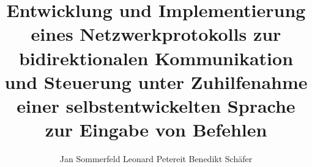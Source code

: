 \documentclass[12pt,a4paper]{scrartcl}
\begin{document}
\title{Entwicklung und Implementierung eines Netzwerkprotokolls zur bidirektionalen Kommunikation und Steuerung unter Zuhilfenahme einer selbstentwickelten Sprache zur Eingabe von Befehlen}
\author{Jan Sommerfeld Leonard Petereit Benedikt Schäfer}
\maketitle
\tableofcontents
\newpage




\end{document}
